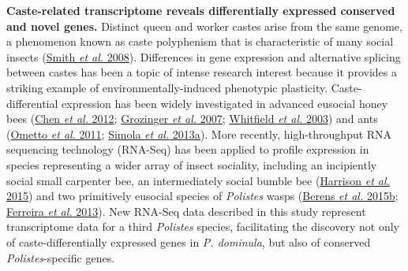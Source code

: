 \documentclass[]{article}
\begin{document}
\textbf{Caste-related transcriptome reveals differentially expressed
conserved and novel genes.} Distinct queen and worker castes arise from
the same genome, a phenomenon known as caste polyphenism that is
characteristic of many social insects
(\protect\hyperlink{ux5fENREFux5f56}{Smith \emph{et al.} 2008}).
Differences in gene expression and alternative splicing between castes
has been a topic of intense research interest because it provides a
striking example of environmentally-induced phenotypic plasticity.
Caste-differential expression has been widely investigated in advanced
eusocial honey bees (\protect\hyperlink{ux5fENREFux5f8}{Chen \emph{et
al.} 2012}; \protect\hyperlink{ux5fENREFux5f16}{Grozinger \emph{et al.}
2007}; \protect\hyperlink{ux5fENREFux5f72}{Whitfield \emph{et al.}
2003}) and ants (\protect\hyperlink{ux5fENREFux5f39}{Ometto \emph{et
al.} 2011}; \protect\hyperlink{ux5fENREFux5f52}{Simola \emph{et al.}
2013a}). More recently, high-throughput RNA sequencing technology
(RNA-Seq) has been applied to profile expression in species representing
a wider array of insect sociality, including an incipiently social small
carpenter bee, an intermediately social bumble bee
(\protect\hyperlink{ux5fENREFux5f18}{Harrison \emph{et al.} 2015}) and
two primitively eusocial species of \emph{Polistes} wasps
(\protect\hyperlink{ux5fENREFux5f3}{Berens \emph{et al.} 2015b};
\protect\hyperlink{ux5fENREFux5f10}{Ferreira \emph{et al.} 2013}). New
RNA-Seq data described in this study represent transcriptome data for a
third \emph{Polistes} species, facilitating the discovery not only of
caste-differentially expressed genes in \emph{P. dominula}, but also of
conserved \emph{Polistes}-specific genes.
\end{document}
